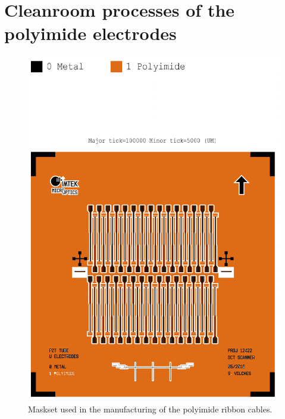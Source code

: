 \section{Cleanroom processes of the polyimide electrodes}
\begin{figure}[h!]\centering \includegraphics[width=12cm]{appendix/piCuffs.pdf}
      \caption{Maskset used in the manufacturing of the polyimide ribbon cables.}
\end{figure}


\clearpage
